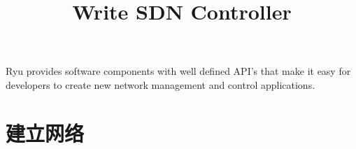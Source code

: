 \endofdump
{}

    \title{Write SDN Controller}
    \maketitle
    \tableofcontents
    \vfill
    Ryu provides software components with well defined API's that make it easy for developers to create new network management and control applications.
    \vfill
    \clearpage
    \section{建立网络}
